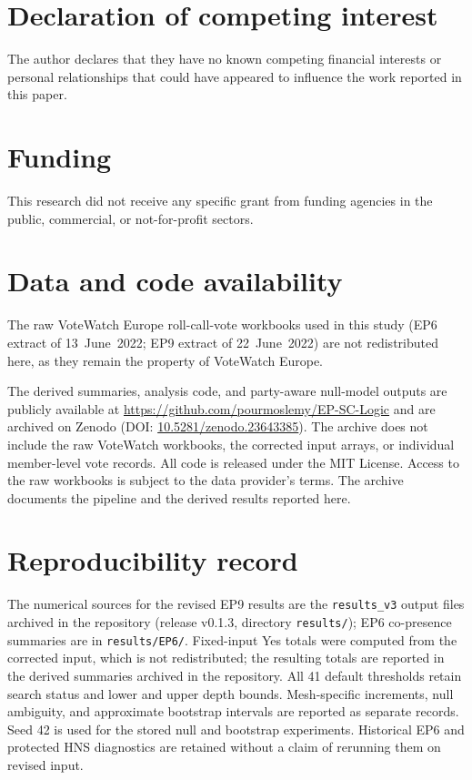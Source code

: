 \documentclass[a4paper,fleqn,oneside]{cas-sc}
\theoremstyle{definition}
\theoremstyle{plain}
\begin{document}
\section*{Declaration of competing interest}
The author declares that they have no known competing financial interests or personal relationships that could have appeared to influence the work reported in this paper.

\section*{Funding}
This research did not receive any specific grant from funding agencies in the public, commercial, or not-for-profit sectors.

\section*{Data and code availability}

The raw VoteWatch Europe roll-call-vote workbooks used in this study (EP6 extract of 13~June~2022; EP9 extract of 22~June~2022) are not redistributed here, as they remain the property of VoteWatch Europe.

The derived summaries, analysis code, and party-aware null-model outputs are
publicly available at \url{https://github.com/pourmoslemy/EP-SC-Logic} and are
archived on Zenodo (DOI: \href{https://doi.org/10.5281/zenodo.23643385}{10.5281/zenodo.23643385}).
The archive does not include the raw VoteWatch workbooks, the corrected input arrays,
or individual member-level vote records. All code is released under the MIT License.
Access to the raw workbooks is subject to the data provider's terms. The archive
documents the pipeline and the derived results reported here.


\appendix
\section{Reproducibility record}\label{app:reproducibility}
The numerical sources for the revised EP9 results are the \texttt{results\_v3} output files archived in the repository (release v0.1.3, directory \texttt{results/}); EP6 co-presence summaries are in \texttt{results/EP6/}. Fixed-input Yes totals were computed from the corrected input, which is not redistributed; the resulting totals are reported in the derived summaries archived in the repository.
 All 41 default thresholds retain search status and lower and upper depth bounds. Mesh-specific increments, null ambiguity, and approximate bootstrap intervals are reported as separate records. Seed 42 is used for the stored null and bootstrap experiments. Historical EP6 and protected HNS diagnostics are retained without a claim of rerunning them on revised input.
\end{document}
